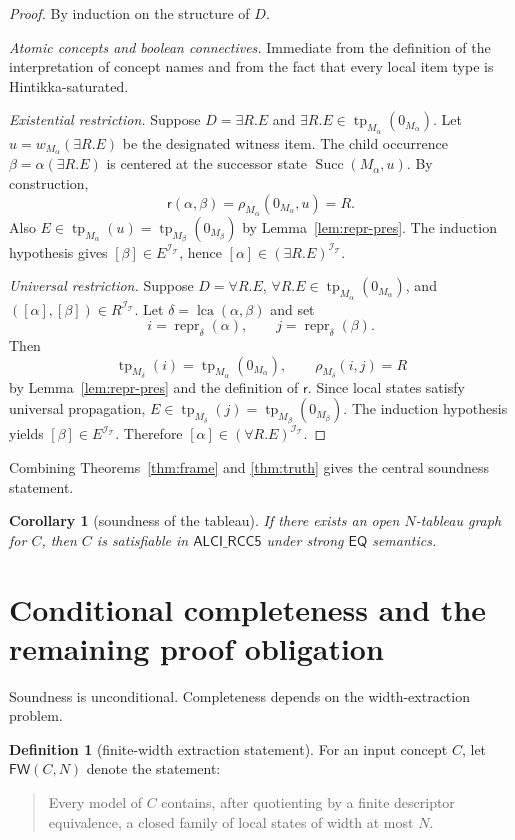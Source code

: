 \documentclass[11pt]{article}
\newtheorem{corollary}[theorem]{Corollary}
\theoremstyle{definition}
\newtheorem{definition}[theorem]{Definition}
\newcommand{\ALCIRCC}{\mathsf{ALCI\_RCC5}}
\newcommand{\tp}{\operatorname{tp}}
\newcommand{\Eq}{\mathsf{EQ}}
\newcommand{\Succ}{\operatorname{Succ}}
\newcommand{\repr}{\operatorname{repr}}
\newcommand{\lca}{\operatorname{lca}}
\begin{document}
\begin{proof}
By induction on the structure of $D$.

\emph{Atomic concepts and boolean connectives.} Immediate from the definition of the interpretation of concept names and from the fact that every local item type is Hintikka-saturated.

\emph{Existential restriction.} Suppose $D=\exists R.E$ and $\exists R.E\in \tp_{M_\alpha}(0_{M_\alpha})$. Let $u=w_{M_\alpha}(\exists R.E)$ be the designated witness item. The child occurrence $\beta=\alpha(\exists R.E)$ is centered at the successor state $\Succ(M_\alpha,u)$. By construction,
\[
\mathsf r(\alpha,\beta)=\rho_{M_\alpha}(0_{M_\alpha},u)=R.
\]
Also $E\in \tp_{M_\alpha}(u)=\tp_{M_\beta}(0_{M_\beta})$ by Lemma~\ref{lem:repr-pres}. The induction hypothesis gives $[\beta]\in E^{\mathcal I_{\mathcal T}}$, hence $[\alpha]\in (\exists R.E)^{\mathcal I_{\mathcal T}}$.

\emph{Universal restriction.} Suppose $D=\forall R.E$, $\forall R.E\in \tp_{M_\alpha}(0_{M_\alpha})$, and $([\alpha],[\beta])\in R^{\mathcal I_{\mathcal T}}$. Let $\delta=\lca(\alpha,\beta)$ and set
\[
 i=\repr_\delta(\alpha),
 \qquad
 j=\repr_\delta(\beta).
\]
Then
\[
\tp_{M_\delta}(i)=\tp_{M_\alpha}(0_{M_\alpha}),
\qquad
\rho_{M_\delta}(i,j)=R
\]
by Lemma~\ref{lem:repr-pres} and the definition of $\mathsf r$. Since local states satisfy universal propagation, $E\in \tp_{M_\delta}(j)=\tp_{M_\beta}(0_{M_\beta})$. The induction hypothesis yields $[\beta]\in E^{\mathcal I_{\mathcal T}}$. Therefore $[\alpha]\in (\forall R.E)^{\mathcal I_{\mathcal T}}$.
\end{proof}

Combining Theorems~\ref{thm:frame} and \ref{thm:truth} gives the central soundness statement.

\begin{corollary}[soundness of the tableau]\label{cor:sound}
If there exists an open $N$-tableau graph for $C$, then $C$ is satisfiable in $\ALCIRCC$ under strong $\Eq$ semantics.
\end{corollary}

\section{Conditional completeness and the remaining proof obligation}

Soundness is unconditional. Completeness depends on the width-extraction problem.

\begin{definition}[finite-width extraction statement]
For an input concept $C$, let $\mathsf{FW}(C,N)$ denote the statement:
\begin{quote}
Every model of $C$ contains, after quotienting by a finite descriptor equivalence, a closed family of local states of width at most $N$.
\end{quote}
\end{definition}
\end{document}

